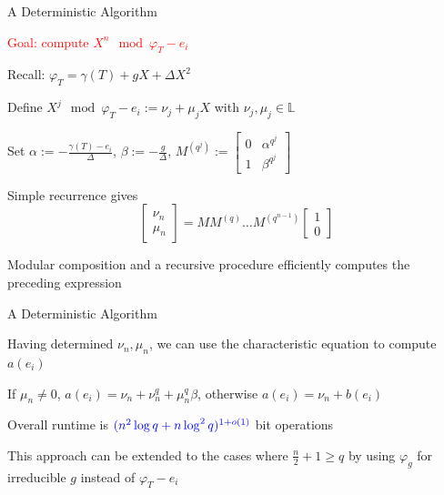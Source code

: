 \documentclass{beamer}
\newcommand{\blue}{\textcolor{blue}}
\newcommand{\red}{\textcolor{red}}
\newcommand{\red}{\textnormal{red}}
\begin{document}

\begin{frame}{A Deterministic Algorithm}

\item \red{Goal: compute $X^n \mod \varphi_{T} - e_i$}
\item Recall: $\varphi_T = \gamma(T) + gX + \Delta X^2$
    
    \item Define $X^j \mod \varphi_{T} - e_i := \nu_j + \mu_j X $ with $\nu_j, \mu_j \in \mathbb{L}$
    
    \item Set $\alpha := -\frac{\gamma(T) - e_i}{\Delta}$, $\beta := - \frac{g}{\Delta}$, $M^{(q^j)} := \begin{bmatrix} 0 & \alpha^{q^j} \\ 1 & \beta^{q^j} \end{bmatrix}$
    
    \item Simple recurrence gives 
    \[\begin{bmatrix} \nu_{n} \\ \mu_n  \end{bmatrix} = M M^{(q)} \ldots M^{(q^{n-1})}  \begin{bmatrix} 1 \\ 0  \end{bmatrix}\]
    
    \item Modular composition and a recursive procedure efficiently computes the preceding expression 

    
\end{frame}


\begin{frame}{A Deterministic Algorithm}

    \item Having determined $\nu_n, \mu_n$, we can use the characteristic equation to compute $a(e_i)$
        \item If $\mu_n \neq 0$, $a(e_i) = \nu_n + \nu_n^q + \mu_n^q \beta$, otherwise $a(e_i) = \nu_n + b(e_i)$
    \item Overall runtime is $\blue{(n^2 \log q + n \log^2 q)^{1+o(1)}}$ bit operations

    \item This approach can be extended to the cases where $\frac{n}{2} + 1 \geq q$ by using $\varphi_{g}$ for irreducible $g$ instead of $\varphi_T - e_i$

    
\end{frame}
\end{document}
